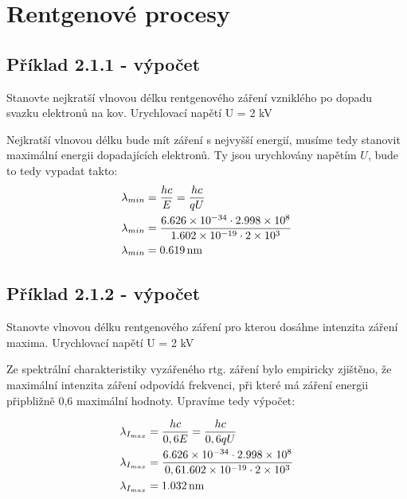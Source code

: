 \section{Rentgenové procesy}


\subsection{Příklad 2.1.1 - výpočet}
\begin{zadani}
    Stanovte nejkratší vlnovou délku rentgenového záření vzniklého 
    po dopadu svazku elektronů na kov. Urychlovací napětí  U = 2 kV
\end{zadani}


Nejkratší vlnovou délku bude mít záření s nejvyšší energií, musíme tedy stanovit maximální energii dopadajících elektronů. Ty jsou urychlovány napětím \(U\), bude to tedy vypadat takto:
\begin{align*}
  \lambda_{min} &=\frac{hc}{E}=\frac{hc}{qU} \\
  \lambda_{min} &=\frac{\num{6.626e-34}\cdot\num{2.998e8}}{\num{1.602e-19}\cdot \num{2e3}}\\
  \lambda_{min} &= \qty{0,619}{nm}
\end{align*}


\subsection{Příklad 2.1.2 - výpočet}
\begin{zadani}
    Stanovte vlnovou délku rentgenového záření pro kterou dosáhne 
    intenzita záření maxima. Urychlovací napětí  U = 2 kV
\end{zadani}


Ze spektrální charakteristiky vyzářeného rtg. záření bylo empiricky zjištěno, že maximální intenzita záření odpovídá frekvenci, při které má záření energii připbližně 0,6 maximální hodnoty. Upravíme tedy výpočet:

\begin{align*}
    \lambda_{I_{max}} &=\frac{hc}{0,6E}=\frac{hc}{0,6qU} \\
    \lambda_{I_{max}} &=\frac{\num{6.626e-34}\cdot\num{2.998e8}}{0,6\num{1.602e-19}\cdot \num{2e3}}\\
    \lambda_{I_{max}} &= \qty{1,032}{nm}
  \end{align*}

